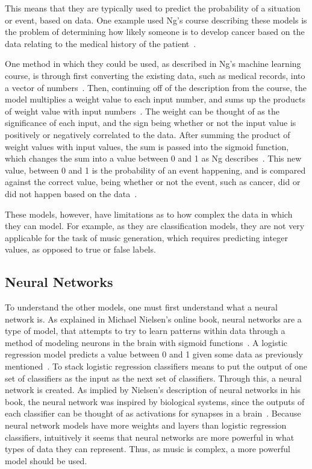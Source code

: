 \documentclass[12pt]{article}
\begin{document}
This means that they are typically used to predict the probability of a
situation or event, based on data. One example used Ng's course describing these
models is the problem of determining how likely someone is to develop cancer
based on the data relating to the medical history of the patient~\cite{ngcourse}.

One method in which they could be used, as described in Ng's machine learning
course, is through first converting the existing data, such as medical records,
into a vector of numbers~\cite{ngrepr}. Then, continuing off of the description
from the course, the model multiplies a weight value to each input number, and
sums up the products of weight value with input numbers~\cite{ngrepr}. The
weight can be thought of as the significance of each input, and the sign being
whether or not the input value is positively or negatively correlated to the
data. After summing the product of weight values with input values, the sum is
passed into the sigmoid function, which changes the sum into a value between 0
and 1 as Ng describes~\cite{ngrepr}. This new value, between 0 and 1 is the
probability of an event happening, and is compared against the correct value,
being whether or not the event, such as cancer, did or did not happen based on
the data~\cite{ngrepr}.

These models, however, have limitations as to how complex the data in which they
can model. For example, as they are classification models, they are not very
applicable for the task of music generation, which requires predicting integer
values, as opposed to true or false labels.

\subsection{Neural Networks}
To understand the other models, one must first understand what a neural network
is. As explained in Michael Nielsen's online book, neural networks are a type of
model, that attempts to try to learn patterns within data through a method of
modeling neurons in the brain with sigmoid functions~\cite{nielbook}. A logistic
regression model predicts a value between 0 and 1 given some data as previously
mentioned~\cite{ngrepr}. To stack logistic regression classifiers means to put
the output of one set of classifiers as the input as the next set of
classifiers. Through this, a neural network is created. As implied by Nielsen's
description of neural networks in his book, the neural network was inspired by
biological systems, since the outputs of each classifier can be thought of as
activations for synapses in a brain~\cite{nielbook}. Because neural network
models have more weights and layers than logistic regression classifiers,
intuitively it seems that neural networks are more powerful in what types of
data they can represent. Thus, as music is complex, a more powerful model should
be used.
\end{document}
